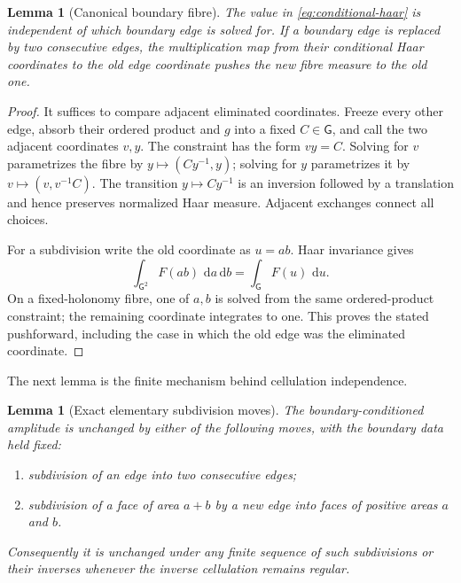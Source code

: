 \documentclass[11pt]{article}
\newtheorem{lemma}[theorem]{Lemma}
\theoremstyle{remark}
\newcommand{\G}{\mathsf G}
\newcommand{\dd}{\,\mathrm d}
\begin{document}
\begin{lemma}[Canonical boundary fibre]\label{lem:boundary-fibre}
The value in \eqref{eq:conditional-haar} is independent of which boundary edge
is solved for.  If a boundary edge is replaced by two consecutive edges, the
multiplication map from their conditional Haar coordinates to the old edge
coordinate pushes the new fibre measure to the old one.
\end{lemma}

\begin{proof}
It suffices to compare adjacent eliminated coordinates.  Freeze every other
edge, absorb their ordered product and $g$ into a fixed $C\in\G$, and call the
two adjacent coordinates $v,y$.  The constraint has the form $vy=C$.  Solving
for $v$ parametrizes the fibre by $y\mapsto(Cy^{-1},y)$; solving for $y$
parametrizes it by $v\mapsto(v,v^{-1}C)$.  The transition $y\mapsto Cy^{-1}$
is an inversion followed by a translation and hence preserves normalized Haar
measure.  Adjacent exchanges connect all choices.

For a subdivision write the old coordinate as $u=ab$.  Haar invariance gives
\[
 \int_{\G^2}F(ab)\,\dd a\dd b=\int_\G F(u)\,\dd u.
\]
On a fixed-holonomy fibre,
one of $a,b$ is solved from the same ordered-product constraint; the remaining
coordinate integrates to one.  This proves the stated pushforward, including
the case in which the old edge was the eliminated coordinate.
\end{proof}

The next lemma is the finite mechanism behind cellulation independence.

\begin{lemma}[Exact elementary subdivision moves]\label{lem:subdivision}
The boundary-conditioned amplitude is unchanged by either of the following
moves, with the boundary data held fixed:
\begin{enumerate}[label=(\roman*),nosep]
\item subdivision of an edge into two consecutive edges;
\item subdivision of a face of area $a+b$ by a new edge into faces of positive
areas $a$ and $b$.
\end{enumerate}
Consequently it is unchanged under any finite sequence of such subdivisions
or their inverses whenever the inverse cellulation remains regular.
\end{lemma}
\end{document}
